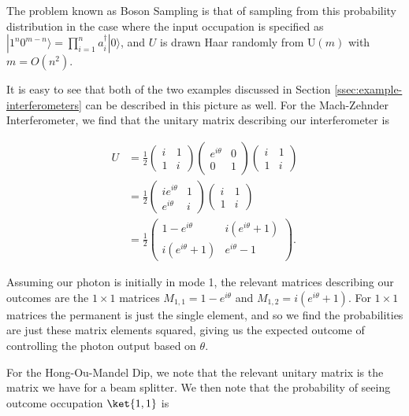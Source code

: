 The problem known as Boson Sampling is that of sampling from this probability distribution in the case where the input occupation is specified as $|1^n 0^{m - n}\rangle = \prod_{i = 1}^n a_{i}^\dagger|0\rangle$, and $U$ is drawn Haar randomly from U$(m)$ with $m=O(n^2)$\cite{aaronson2010, aaronson2010}.

It is easy to see that both of the two examples discussed in Section \ref{ssec:example-interferometers} can be described in this picture as well. For the Mach-Zehnder Interferometer, we find that the unitary matrix describing our interferometer is

\begin{align}
U &= \frac{1}{2}\begin{pmatrix}i&1\\1&i\end{pmatrix}\begin{pmatrix}e^{i\theta}&0\\0&1\end{pmatrix}\begin{pmatrix}i&1\\1&i\end{pmatrix}\\
&= \frac{1}{2}\begin{pmatrix}ie^{i\theta}&1\\e^{i\theta}&i\end{pmatrix}\begin{pmatrix}i&1\\1&i\end{pmatrix}\\
&= \frac{1}{2}\begin{pmatrix}1-e^{i\theta}&i(e^{i\theta}+1)\\i(e^{i\theta}+1)&e^{i\theta}-1\end{pmatrix}.
\end{align}

Assuming our photon is initially in mode 1, the relevant matrices describing our outcomes are the $1\times 1$ matrices $M_{1,1} = 1-e^{i\theta}$ and $M_{1,2} = i(e^{i\theta}+1)$. For $1\times 1$ matrices the permanent is just the single element, and so we find the probabilities are just these matrix elements squared, giving us the expected outcome of controlling the photon output based on $\theta$.

For the Hong-Ou-Mandel Dip, we note that the relevant unitary matrix is the matrix we have for a beam splitter. We then note that the probability of seeing outcome occupation $\ket{1,1}$ is

